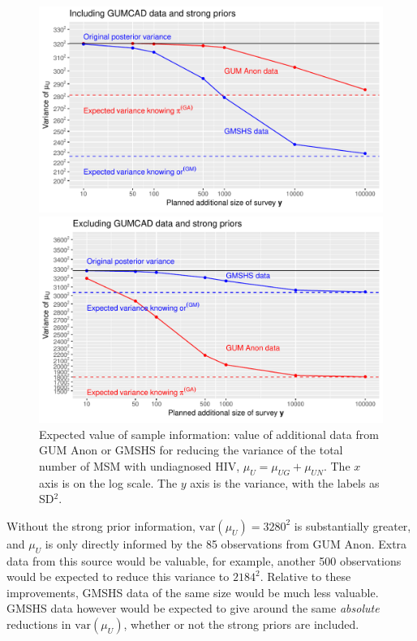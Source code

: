 \documentclass[12pt]{article}\usepackage[]{graphicx}\usepackage[]{color}
\makeatletter
\def\maxwidth{ %
  \ifdim\Gin@nat@width>\linewidth
    \linewidth
  \else
    \Gin@nat@width
  \fi
}
\newenvironment{knitrout}{}{} %
\newcommand{\var}{\mbox{var}}
\makeatother
\begin{document}
\begin{figure}
\begin{knitrout}
\color{fgcolor}
\includegraphics[width=\maxwidth]{figure/evsi-1} 

\includegraphics[width=\maxwidth]{figure/evsi-2} 

\end{knitrout}
  \caption{Expected value of sample information: value of additional data from GUM Anon or GMSHS for reducing the variance of the total number of MSM with undiagnosed HIV, $\mu_U = \mu_{UG}+\mu_{UN}$.  The $x$ axis is on the log scale. The $y$ axis is the variance, with the labels as SD$^2$. }
  \label{fig:res:evsi}
\end{figure}

Without the strong prior information, $\var(\mu_U)=3280^2$ is substantially greater, and $\mu_U$ is only directly informed by the 85 observations from GUM Anon.  Extra data from this source would be valuable, for example, another 500 observations would be expected to reduce this variance to $2184^2$.   Relative to these improvements, GMSHS data of the same size would be much less valuable.   GMSHS data however would be expected to give around the same \emph{absolute} reductions in $\var(\mu_U)$, whether or not the strong priors are included.
\end{document}
